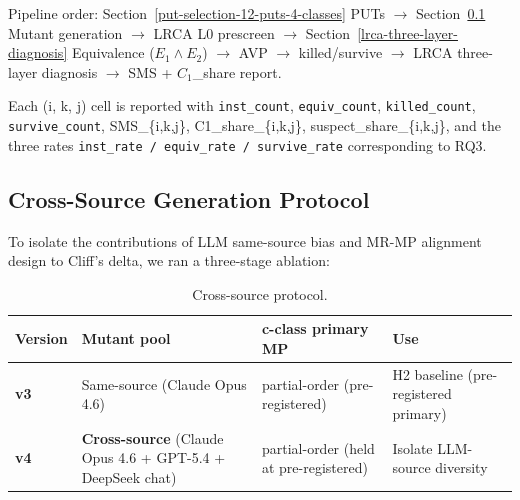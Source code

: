\documentclass[manuscript,screen,review]{acmart}
\begin{document}
\noindent\textsf{\small Pipeline order: Section~\ref{put-selection-12-puts-4-classes} PUTs $\to$ Section~\ref{cross-source-v4-protocol-summary} Mutant generation $\to$ LRCA L0 prescreen $\to$ Section~\ref{lrca-three-layer-diagnosis} Equivalence ($E_1 \wedge E_2$) $\to$ AVP $\to$ killed/survive $\to$ LRCA three-layer diagnosis $\to$ SMS + $C_1$\_share report.}

Each (i, k, j) cell is reported with \texttt{inst\_count},
\texttt{equiv\_count}, \texttt{killed\_count}, \texttt{survive\_count},
SMS\_\{i,k,j\}, C1\_share\_\{i,k,j\}, suspect\_share\_\{i,k,j\}, and the
three rates \texttt{inst\_rate\ /\ equiv\_rate\ /\ survive\_rate}
corresponding to RQ3.

\subsection{Cross-Source Generation Protocol}\label{cross-source-v4-protocol-summary}

To isolate the contributions of LLM same-source bias and MR-MP alignment
design to Cliff's delta, we ran a three-stage ablation:

{%
\begin{longtable}[]{@{}
  >{\raggedright\arraybackslash}p{}
  >{\raggedright\arraybackslash}p{}
  >{\raggedright\arraybackslash}p{}
  >{\raggedright\arraybackslash}p{}@{}}
\caption{Cross-source protocol.}\label{tab:p2-06}\\
\toprule\noalign{}
\begin{minipage}[b]{\linewidth}\raggedright
Version
\end{minipage} & \begin{minipage}[b]{\linewidth}\raggedright
Mutant pool
\end{minipage} & \begin{minipage}[b]{\linewidth}\raggedright
c-class primary MP
\end{minipage} & \begin{minipage}[b]{\linewidth}\raggedright
Use
\end{minipage} \\
\midrule\noalign{}
\endhead
\bottomrule\noalign{}
\endlastfoot
\textbf{v3} & Same-source (Claude Opus 4.6) & partial-order (pre-registered) & H2
baseline (pre-registered primary) \\
\textbf{v4} & \textbf{Cross-source} (Claude Opus 4.6 + GPT-5.4 +
DeepSeek chat) & partial-order (held at pre-registered) & Isolate LLM-source
diversity \\
\end{longtable}
}
\end{document}
